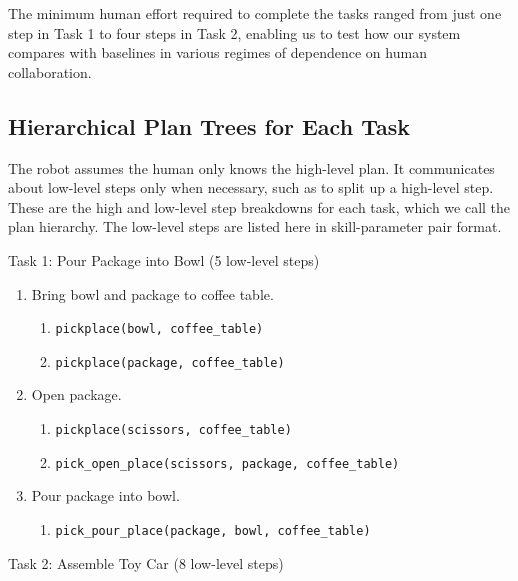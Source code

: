 The minimum human effort required to complete the tasks ranged from just one step in Task 1 to four steps in Task 2, enabling us to test how our system compares with baselines in various regimes of dependence on human collaboration.

\subsection*{Hierarchical Plan Trees for Each Task}
The robot assumes the human only knows the high-level plan. It communicates about low-level steps only when necessary, such as to split up a high-level step. These are the high and low-level step breakdowns for each task, which we call the plan hierarchy. The low-level steps are listed here in skill-parameter pair format.

Task 1: Pour Package into Bowl (5 low-level steps)
\begin{enumerate}
    \item Bring bowl and package to coffee table.
        \begin{enumerate}
            \item \texttt{pickplace(bowl, coffee\_table)}
            \item \texttt{pickplace(package, coffee\_table)}
        \end{enumerate}
    \item Open package.
        \begin{enumerate}
            \item \texttt{pickplace(scissors, coffee\_table)}
            \item \texttt{pick\_open\_place(scissors, package, coffee\_table)}
        \end{enumerate}
    \item Pour package into bowl.
        \begin{enumerate}
            \item \texttt{pick\_pour\_place(package, bowl, coffee\_table)}
        \end{enumerate}
\end{enumerate}
Task 2: Assemble Toy Car (8 low-level steps)
